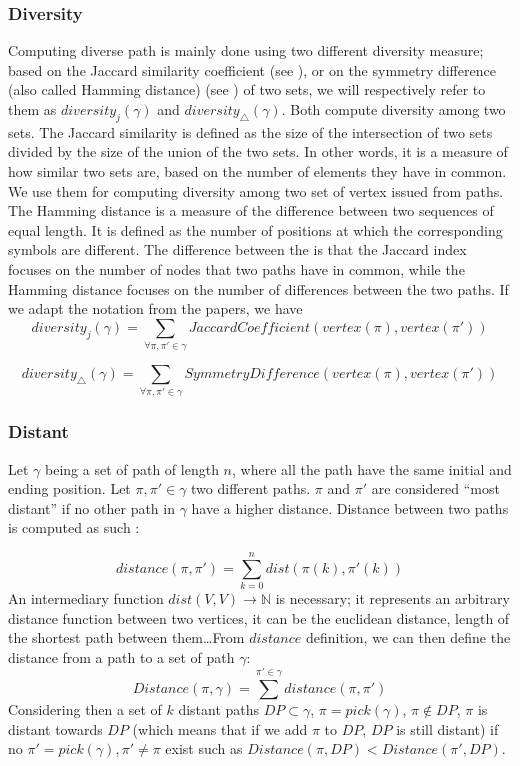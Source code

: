 \subsubsection{Diversity}\label{sec:diversity}

Computing diverse path is mainly done using two different diversity measure; based on the Jaccard similarity coefficient (see \cite{habochal21a}), or on the symmetry difference (also called Hamming distance) (see \cite{hanaka2022computing}) of two sets, we will respectively refer to them as \(diversity_j(\gamma)\) and \(diversity_{\bigtriangleup}(\gamma)\). Both compute diversity among two sets. The Jaccard similarity is defined as the size of the intersection of two sets divided by the size of the union of the two sets. In other words, it is a measure of how similar two sets are, based on the number of elements they have in common. We use them for computing diversity among two set of vertex issued from paths. The Hamming distance is a measure of the difference between two sequences of equal length. It is defined as the number of positions at which the corresponding symbols are different. The difference between the is that the Jaccard index focuses on the number of nodes that two paths have in common, while the Hamming distance focuses on the number of differences between the two paths. If we adapt the notation from the papers, we have
\[
  diversity_j(\gamma)=\sum_{\forall \pi,\pi' \in \gamma}{JaccardCoefficient(vertex(\pi),vertex(\pi'))}
\]

\[
  diversity_{\bigtriangleup}(\gamma)=\sum_{\forall \pi,\pi' \in \gamma}{SymmetryDifference(vertex(\pi),vertex(\pi'))}
\]  





\subsubsection{Distant}\label{sec:distant}
Let \(\gamma\) being a set of path of length \(n\), where all the path have the same initial and ending position. Let \(\pi,\pi' \in \gamma\) two different paths. \(\pi\) and \(\pi'\) are considered ``most distant'' if no other path in \(\gamma\) have a higher distance. Distance between two paths is computed as such :


\[
  distance(\pi,\pi') = \sum_{k=0}^{n}{dist(\pi(k),\pi'(k))}   
 \] An intermediary function \(dist(V,V) \rightarrow \mathbb{N}\) is necessary; it represents an arbitrary distance function between two vertices, it can be the euclidean distance, length of the shortest path between them\ldots From \(distance\) definition, we can then define the distance from a path to a set of path \(\gamma\): \[
  Distance(\pi,\gamma) = \sum^{\pi'\in\gamma}{distance(\pi,\pi')}   
\] Considering then a set of \(k\) distant paths \(DP \subset \gamma \), \(\pi = pick(\gamma)\), \(\pi \notin DP \), \(\pi\) is distant towards \(DP\) (which means that if we add \(\pi\) to \(DP\), \(DP\) is still distant) if no \(\pi' = pick(\gamma), \pi' \neq \pi\) exist such as \( Distance(\pi,DP) < Distance(\pi',DP)\).


